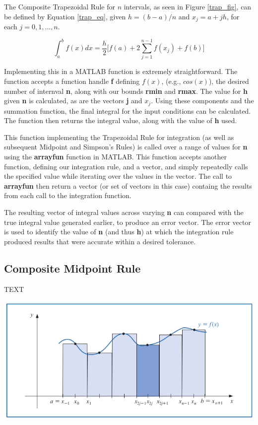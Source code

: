 \documentclass[a4paper]{article}
\begin{document}
The Composite Trapezoidal Rule for $n$ intervals, as seen in Figure \ref{trap_fig}, can be defined by Equation \ref{trap_eq}, given $h=(b-a)/n$ and $x_j=a+jh$, for each $j=0,1,\dots,n$\cite{burden2010}.

\begin{equation}
\int_{a}^b f(x) dx = \frac{h}{2} \Bigg[ f(a) + 2 \sum_{j=1}^{n-1} f(x_j) + f(b) \Bigg]
\label{trap_eq}
\end{equation}

Implementing this in a MATLAB function is extremely straightforward. The function accepts a function handle \textbf{f} defining $f(x)$, (e.g., $cos(x)$), the desired number of internval \textbf{n}, along with our bounds \textbf{rmin} and \textbf{rmax}. The value for \textbf{h} given \textbf{n} is calculated, as are the vectors \textbf{j} and \textbf{$x_j$}. Using these components and the summation function, the final integral for the input conditions can be calculated. The function then returns the integral value, along with the value of \textbf{h} used.

This function implementing the Trapezoidal Rule for integration (as well as subsequent Midpoint and Simpson's Rules) is called over a range of values for \textbf{n} using the \textbf{arrayfun} function in MATLAB. This function accepts another function, defining our integration rule, and a vector, and simply repeatedly calls the specified value while iterating over the values in the vector. The call to \textbf{arrayfun} then return a vector (or set of vectors in this case) containg the results from each call to the integration function.

 The resulting vector of integral values across varying \textbf{n} can compared with the true integral value generated earlier, to produce an error vector. The error vector is used to identify the value of \textbf{n} (and thus \textbf{h}) at which the integration rule produced results that were accurate within a desired tolerance.



\subsection{Composite Midpoint Rule}
TEXT

\begin{center}
	\includegraphics[width=1\textwidth]{../additional/midpoint_fig.png}
	\label{mid_fig}
\end{center}
\end{document}

